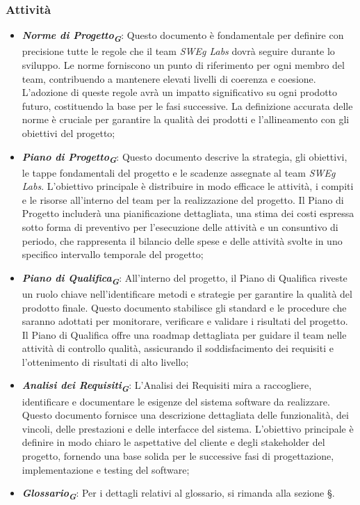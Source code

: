 \subsubsection{Attività}

\begin{itemize}
\item \textbf{\emph{Norme di Progetto}}\textsubscript{\textit{\textbf{G}}}: Questo documento è fondamentale per definire con precisione tutte le regole che il team \emph{SWEg Labs} dovrà seguire durante lo sviluppo. Le norme forniscono un punto di riferimento per ogni membro del team, contribuendo a mantenere elevati livelli di coerenza e coesione. L'adozione di queste regole avrà un impatto significativo su ogni prodotto futuro, costituendo la base per le fasi successive. La definizione accurata delle norme è cruciale per garantire la qualità dei prodotti e l’allineamento con gli obiettivi del progetto;
\item \textbf{\emph{Piano di Progetto}}\textsubscript{\textit{\textbf{G}}}: Questo documento descrive la strategia, gli obiettivi, le tappe fondamentali del progetto e le scadenze assegnate al team \emph{SWEg Labs}. L'obiettivo principale è distribuire in modo efficace le attività, i compiti e le risorse all'interno del team per la realizzazione del progetto. Il Piano di Progetto includerà una pianificazione dettagliata, una stima dei costi espressa sotto forma di preventivo per l’esecuzione delle attività e un consuntivo di periodo, che rappresenta il bilancio delle spese e delle attività svolte in uno specifico intervallo temporale del progetto;
\item \textbf{\emph{Piano di Qualifica}}\textsubscript{\textit{\textbf{G}}}: All'interno del progetto, il Piano di Qualifica riveste un ruolo chiave nell'identificare metodi e strategie per garantire la qualità del prodotto finale. Questo documento stabilisce gli standard e le procedure che saranno adottati per monitorare, verificare e validare i risultati del progetto. Il Piano di Qualifica offre una roadmap dettagliata per guidare il team nelle attività di controllo qualità, assicurando il soddisfacimento dei requisiti e l'ottenimento di risultati di alto livello;
\item \textbf{\emph{Analisi dei Requisiti}}\textsubscript{\textit{\textbf{G}}}: L'Analisi dei Requisiti mira a raccogliere, identificare e documentare le esigenze del sistema software da realizzare. Questo documento fornisce una descrizione dettagliata delle funzionalità, dei vincoli, delle prestazioni e delle interfacce del sistema. L'obiettivo principale è definire in modo chiaro le aspettative del cliente e degli stakeholder del progetto, fornendo una base solida per le successive fasi di progettazione, implementazione e testing del software;
\item \textbf{\emph{Glossario}}\textsubscript{\textit{\textbf{G}}}: Per i dettagli relativi al glossario, si rimanda alla sezione \S{}.
\end{itemize}

